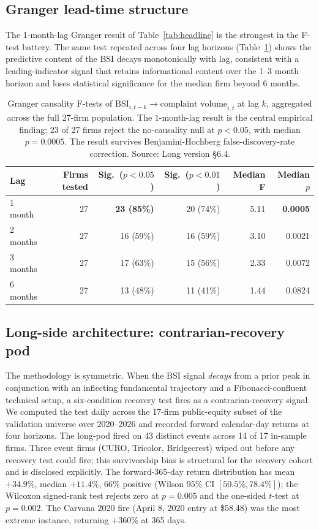 \documentclass[11pt,a4paper]{article}
\begin{document}
\subsection*{Granger lead-time structure}

The 1-month-lag Granger result of Table~\ref{tab:headline} is the strongest in the F-test battery. The same test repeated across four lag horizons (Table~\ref{tab:granger}) shows the predictive content of the BSI decays monotonically with lag, consistent with a leading-indicator signal that retains informational content over the 1--3 month horizon and loses statistical significance for the median firm beyond 6 months.

\begin{table}[h]
\centering\small
\begin{tabular}{@{}lrrrrr@{}}
\toprule
\textbf{Lag} & \textbf{Firms tested} & \textbf{Sig.\ ($p<0.05$)} & \textbf{Sig.\ ($p<0.01$)} & \textbf{Median F} & \textbf{Median $p$} \\
\midrule
1 month  & 27 & \textbf{23 (85\%)} & 20 (74\%) & 5.11 & \textbf{0.0005} \\
2 months & 27 & 16 (59\%) & 16 (59\%) & 3.10 & 0.0021 \\
3 months & 27 & 17 (63\%) & 15 (56\%) & 2.33 & 0.0072 \\
6 months & 27 & 13 (48\%) & 11 (41\%) & 1.44 & 0.0824 \\
\bottomrule
\end{tabular}
\caption{Granger causality F-tests of $\text{BSI}_{i,t-k} \to \text{complaint volume}_{i,t}$ at lag $k$, aggregated across the full 27-firm population. The 1-month-lag result is the central empirical finding: 23 of 27 firms reject the no-causality null at $p < 0.05$, with median $p = 0.0005$. The result survives Benjamini-Hochberg false-discovery-rate correction. Source: Long version §6.4.}\label{tab:granger}
\end{table}

\subsection*{Long-side architecture: contrarian-recovery pod}

The methodology is symmetric. When the BSI signal \emph{decays} from a prior peak in conjunction with an inflecting fundamental trajectory and a Fibonacci-confluent technical setup, a six-condition recovery test fires as a contrarian-recovery signal. We computed the test daily across the 17-firm public-equity subset of the validation universe over 2020--2026 and recorded forward calendar-day returns at four horizons. The long-pod fired on 43 distinct events across 14 of 17 in-sample firms. Three event firms (CURO, Tricolor, Bridgecrest) wiped out before any recovery test could fire; this survivorship bias is structural for the recovery cohort and is disclosed explicitly. The forward-365-day return distribution has mean $+34.9\%$, median $+11.4\%$, 66\% positive (Wilson 95\% CI $[50.5\%, 78.4\%]$); the Wilcoxon signed-rank test rejects zero at $p = 0.005$ and the one-sided $t$-test at $p = 0.002$. The Carvana 2020 fire (April 8, 2020 entry at \$58.48) was the most extreme instance, returning $+360\%$ at 365 days.
\end{document}
